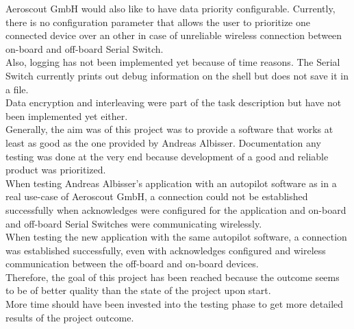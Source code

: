 Aeroscout GmbH would also like to have data priority configurable. Currently, there is no configuration parameter that allows the user to prioritize one connected device over an other in case of unreliable wireless connection between on-board and off-board Serial Switch.\\
Also, logging has not been implemented yet because of time reasons. The Serial Switch currently prints out debug information on the shell but does not save it in a file.\\
Data encryption and interleaving were part of the task description but have not been implemented yet either.\\
Generally, the aim was of this project was to provide a software that works at least as good as the one provided by Andreas Albisser. Documentation any testing was done at the very end because development of a good and reliable product was prioritized.\\
When testing Andreas Albisser's application with an autopilot software as in a real use-case of Aeroscout GmbH, a connection could not be established successfully when acknowledges were configured for the application and on-board and off-board Serial Switches were communicating wirelessly.\\
When testing the new application with the same autopilot software, a connection was established successfully, even with acknowledges configured and wireless communication between the off-board and on-board devices.\\
Therefore, the goal of this project has been reached because the outcome seems to be of better quality than the state of the project upon start.\\
More time should have been invested into the testing phase to get more detailed results of the project outcome.
%
%
%
%
%
%
%
%
%
